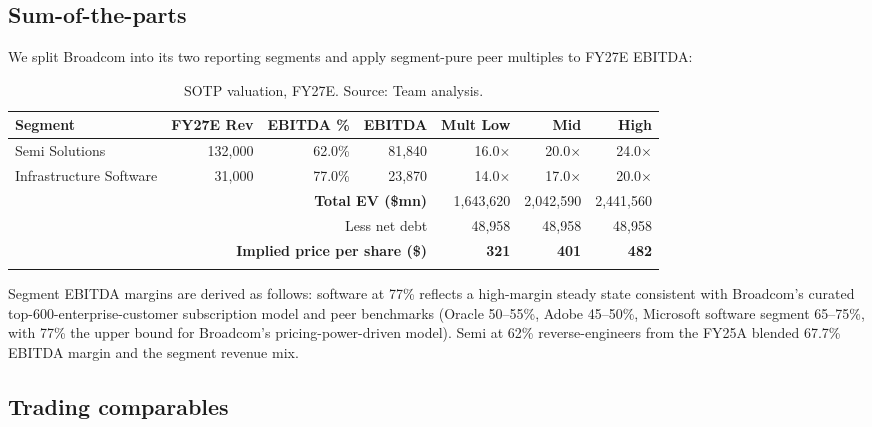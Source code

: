 \documentclass[10pt,letterpaper]{article}
\begin{document}
\subsection{Sum-of-the-parts}

We split Broadcom into its two reporting segments and apply segment-pure peer multiples to FY27E EBITDA:

\begin{table}[H]
\centering
\small
{}
\setlength{\tabcolsep}{4pt}
\begin{tabular}{p{4.6cm}rrrrrr}
\arrayrulecolor{nyuviolet}\toprule
\rowcolor{nyuviolet}\color{white}\textbf{Segment} & \color{white}\textbf{FY27E Rev} & \color{white}\textbf{EBITDA \%} & \color{white}\textbf{EBITDA} & \color{white}\textbf{Mult Low} & \color{white}\textbf{Mid} & \color{white}\textbf{High} \\
\midrule
Semi Solutions          & 132{,}000 & 62.0\% & 81{,}840 & 16.0$\times$ & 20.0$\times$ & 24.0$\times$ \\
Infrastructure Software & 31{,}000  & 77.0\% & 23{,}870 & 14.0$\times$ & 17.0$\times$ & 20.0$\times$ \\
\midrule
\multicolumn{4}{r}{\textbf{Total EV (\$mn)}}              & 1{,}643{,}620 & 2{,}042{,}590 & 2{,}441{,}560 \\
\multicolumn{4}{r}{Less net debt}                          & 48{,}958      & 48{,}958      & 48{,}958      \\
\multicolumn{4}{r}{\textbf{Implied price per share (\$)}}  & \textbf{321}  & \textbf{401}  & \textbf{482}  \\
\arrayrulecolor{nyuviolet}\bottomrule
\end{tabular}
\caption{SOTP valuation, FY27E. Source: Team analysis.}
\end{table}

Segment EBITDA margins are derived as follows: software at 77\% reflects a high-margin steady state consistent with Broadcom's curated top-600-enterprise-customer subscription model and peer benchmarks (Oracle 50--55\%, Adobe 45--50\%, Microsoft software segment 65--75\%, with 77\% the upper bound for Broadcom's pricing-power-driven model). Semi at 62\% reverse-engineers from the FY25A blended 67.7\% EBITDA margin and the segment revenue mix.

\subsection{Trading comparables}
\end{document}
